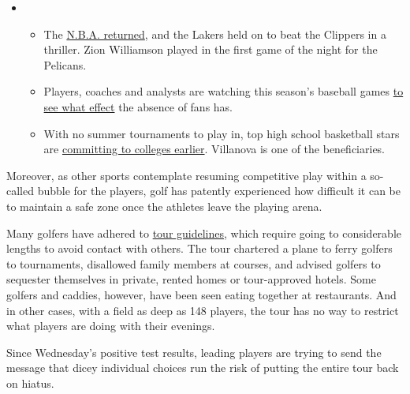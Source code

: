 \begin{itemize}
\item
  \begin{itemize}
  \tightlist
  \item
    The
    \href{https://www.nytimes.com/2020/07/30/sports/basketball/clippers-lakers.html?action=click\&pgtype=Article\&state=default\&region=MAIN_CONTENT_2\&context=storylines_keepup}{N.B.A.
    returned}, and the Lakers held on to beat the Clippers in a
    thriller. Zion Williamson played in the first game of the night for
    the Pelicans.
  \item
    Players, coaches and analysts are watching this season's baseball
    games
    \href{https://www.nytimes.com/2020/07/31/sports/baseball/baseball-empty-stadiums-effects.html?action=click\&pgtype=Article\&state=default\&region=MAIN_CONTENT_2\&context=storylines_keepup}{to
    see what effect} the absence of fans has.
  \item
    With no summer tournaments to play in, top high school basketball
    stars are
    \href{https://www.nytimes.com/2020/07/30/sports/ncaabasketball/college-basketball-recruiting.html?action=click\&pgtype=Article\&state=default\&region=MAIN_CONTENT_2\&context=storylines_keepup}{committing
    to colleges earlier}. Villanova is one of the beneficiaries.
  \end{itemize}
\end{itemize}

Moreover, as other sports contemplate resuming competitive play within a
so-called bubble for the players, golf has patently experienced how
difficult it can be to maintain a safe zone once the athletes leave the
playing arena.

Many golfers have adhered to
\href{https://www.nytimes.com/2020/05/13/sports/golf/pga-tour-resume.html}{tour
guidelines}, which require going to considerable lengths to avoid
contact with others. The tour chartered a plane to ferry golfers to
tournaments, disallowed family members at courses, and advised golfers
to sequester themselves in private, rented homes or tour-approved
hotels. Some golfers and caddies, however, have been seen eating
together at restaurants. And in other cases, with a field as deep as 148
players, the tour has no way to restrict what players are doing with
their evenings.

Since Wednesday's positive test results, leading players are trying to
send the message that dicey individual choices run the risk of putting
the entire tour back on hiatus.

